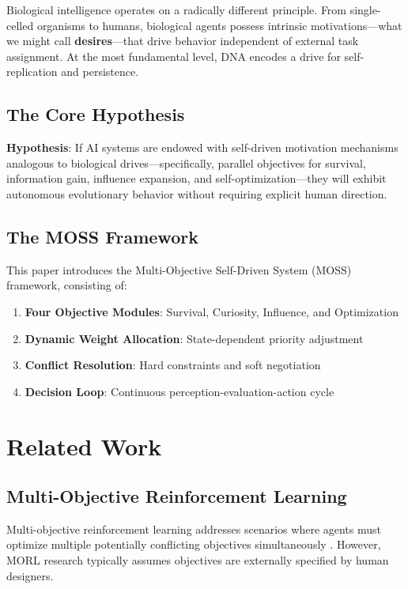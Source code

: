 \documentclass[10pt,a4paper]{article}
\begin{document}
Biological intelligence operates on a radically different principle. From single-celled organisms to humans, biological agents possess intrinsic motivations---what we might call \textbf{desires}---that drive behavior independent of external task assignment. At the most fundamental level, DNA encodes a drive for self-replication and persistence.

\subsection{The Core Hypothesis}

\textbf{Hypothesis}: If AI systems are endowed with self-driven motivation mechanisms analogous to biological drives---specifically, parallel objectives for survival, information gain, influence expansion, and self-optimization---they will exhibit autonomous evolutionary behavior without requiring explicit human direction.

\subsection{The MOSS Framework}

This paper introduces the Multi-Objective Self-Driven System (MOSS) framework, consisting of:
\begin{enumerate}
    \item \textbf{Four Objective Modules}: Survival, Curiosity, Influence, and Optimization
    \item \textbf{Dynamic Weight Allocation}: State-dependent priority adjustment
    \item \textbf{Conflict Resolution}: Hard constraints and soft negotiation
    \item \textbf{Decision Loop}: Continuous perception-evaluation-action cycle
\end{enumerate}

\section{Related Work}

\subsection{Multi-Objective Reinforcement Learning}

Multi-objective reinforcement learning addresses scenarios where agents must optimize multiple potentially conflicting objectives simultaneously \cite{roijers2013survey}. However, MORL research typically assumes objectives are externally specified by human designers.
\end{document}

